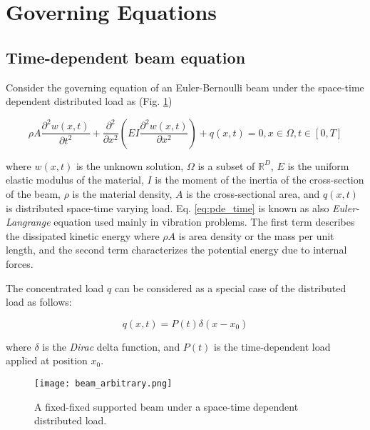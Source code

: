 \section{Governing Equations}

\subsection{Time-dependent beam equation}

Consider the governing equation of an Euler-Bernoulli beam under 
the space-time dependent distributed load as (Fig. \ref{fig:beam_arbitrary})

\begin{equation}
    \label{eq:pde_time}
    \rho A \frac{\partial^{2} w(x,t)}{\partial t^{2}} + \frac{\partial^{2}}{\partial x^{2}}\left(E I \frac{\partial^{2} w(x,t)}{\partial x^{2}}\right) + q(x, t) = 0, x \in \Omega, t \in [0,T]
\end{equation}


\noindent where $w(x,t)$ is the unknown solution, $\Omega$ is a subset of $\mathbb{R}^{D}$,
$E$ is the uniform elastic modulus of the material, 
$I$ is the moment of the inertia of the cross-section of the beam, $\rho$
is the material density, $A$ is the cross-sectional area, and $q(x,t)$ is distributed space-time varying load. 
Eq. \ref{eq:pde_time} is known as also 
\textit{Euler-Langrange} equation \cite{wang2007vibration} used mainly in vibration problems. The first term
describes the dissipated kinetic energy where $\rho A$ is area density or the mass per unit length, 
and the second term characterizes the potential energy due to internal forces. 

\vspace{3mm}

\noindent The concentrated load $q$ can be considered as a special case of the distributed load as follows:

\begin{equation}
    \label{eq:load_time}
    q(x,t) = P(t)\delta\left(x-x_{0}\right)
\end{equation}

\noindent where $\delta$ is the \textit{Dirac} delta function, and $P(t)$ is the time-dependent load applied
at position $x_{0}$.



\begin{figure}[!ht]
    \centering
    \texttt{[image: beam\_arbitrary.png]}  
    \caption{A fixed-fixed supported beam under a space-time dependent distributed load.}
    \label{fig:beam_arbitrary}
\end{figure}

